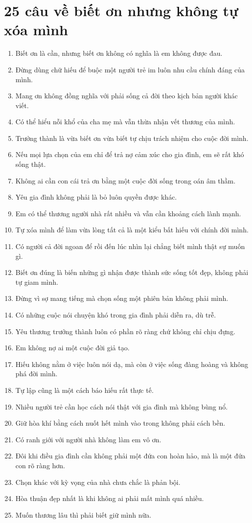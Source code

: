 \section{25 câu về biết ơn nhưng không tự xóa mình}
\begin{enumerate}[leftmargin=*,resume]
\item Biết ơn là cần, nhưng biết ơn không có nghĩa là em không được đau.
\item Đừng dùng chữ hiếu để buộc một người trẻ im luôn nhu cầu chính đáng của mình.
\item Mang ơn không đồng nghĩa với phải sống cả đời theo kịch bản người khác viết.
\item Có thể hiểu nỗi khổ của cha mẹ mà vẫn thừa nhận vết thương của mình.
\item Trưởng thành là vừa biết ơn vừa biết tự chịu trách nhiệm cho cuộc đời mình.
\item Nếu mọi lựa chọn của em chỉ để trả nợ cảm xúc cho gia đình, em sẽ rất khó sống thật.
\item Không ai cần con cái trả ơn bằng một cuộc đời sống trong oán âm thầm.
\item Yêu gia đình không phải là bỏ luôn quyền được khác.
\item Em có thể thương người nhà rất nhiều và vẫn cần khoảng cách lành mạnh.
\item Tự xóa mình để làm vừa lòng tất cả là một kiểu bất hiếu với chính đời mình.
\item Có người cả đời ngoan để rồi đến lúc nhìn lại chẳng biết mình thật sự muốn gì.
\item Biết ơn đúng là biến những gì nhận được thành sức sống tốt đẹp, không phải tự giam mình.
\item Đừng vì sợ mang tiếng mà chọn sống một phiên bản không phải mình.
\item Có những cuộc nói chuyện khó trong gia đình phải diễn ra, dù trễ.
\item Yêu thương trưởng thành luôn có phần rõ ràng chứ không chỉ chịu đựng.
\item Em không nợ ai một cuộc đời giả tạo.
\item Hiếu không nằm ở việc luôn nói dạ, mà còn ở việc sống đàng hoàng và không phá đời mình.
\item Tự lập cũng là một cách báo hiếu rất thực tế.
\item Nhiều người trẻ cần học cách nói thật với gia đình mà không bùng nổ.
\item Giữ hòa khí bằng cách nuốt hết mình vào trong không phải cách bền.
\item Có ranh giới với người nhà không làm em vô ơn.
\item Đôi khi điều gia đình cần không phải một đứa con hoàn hảo, mà là một đứa con rõ ràng hơn.
\item Chọn khác với kỳ vọng của nhà chưa chắc là phản bội.
\item Hòa thuận đẹp nhất là khi không ai phải mất mình quá nhiều.
\item Muốn thương lâu thì phải biết giữ mình nữa.
\end{enumerate}

